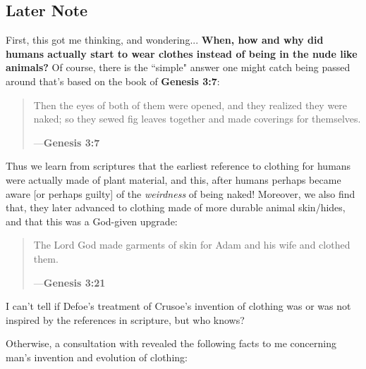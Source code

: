 \documentclass[a4paper]{article}
\begin{document}
\subsection{Later Note}

First, this got me thinking, and wondering... \textbf{When, how and why did humans actually start to wear clothes instead of being in the nude like animals?} Of course, there is the ``simple" answer one might catch being passed around that's based on the book of \textbf{Genesis 3:7}:


\noindent
\begin{minipage}{1\textwidth}
\vspace{1em}
\begin{quotation}
{\ttfamily

Then the eyes of both of them were opened, and they realized they were naked; so they sewed fig leaves together and made coverings for themselves.

}
\hspace*{\fill} ---\textbf{Genesis 3:7}
\end{quotation}
\vspace{1em}
\end{minipage}

Thus we learn from scriptures that the earliest reference to clothing for humans were actually made of plant material, and this, after humans perhaps became aware [or perhaps guilty] of the \textit{weirdness} of being naked! Moreover, we also find that, they later advanced to clothing made of more durable animal skin/hides, and that this was a God-given upgrade:


\noindent
\begin{minipage}{1\textwidth}
\vspace{1em}
\begin{quotation}
{\ttfamily

The Lord God made garments of skin for Adam and his wife and clothed them.

}
\hspace*{\fill} ---\textbf{Genesis 3:21}
\end{quotation}
\vspace{1em}
\end{minipage}


I can't tell if Defoe's treatment of Crusoe's invention of clothing was or was not inspired by the references in scripture, but who knows?


Otherwise, a consultation with \cite{copilot_assistant} revealed the following facts to me concerning man's invention and evolution of clothing:
\end{document}
